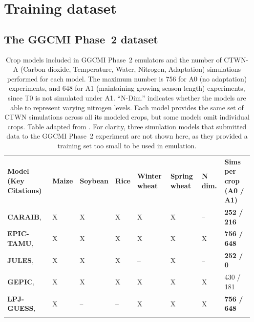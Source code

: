 \documentclass[gmdd]{copernicus} %
\begin{document}
\section{Training dataset}
\label{S:2}
\subsection{The GGCMI Phase~2 dataset}
\label{S:2a}
\begin{table}[ht]
    \caption{
    Crop models included in GGCMI Phase~2 emulators and the number of CTWN-A (Carbon dioxide, Temperature, Water, Nitrogen, Adaptation) simulations performed for each model. 
    The maximum number is 756 for A0 (no adaptation) experiments, and 648 for A1 (maintaining growing season length) experiments, since T0 is not simulated under A1. 
    ``N-Dim.'' indicates whether the models are able to represent varying nitrogen levels.
    Each model provides the same set of CTWN simulations across all its modeled crops, but some models omit individual crops.
    Table adapted from \citet{franke2020ctwnexperiment}. 
    For clarity, three simulation models that submitted data to the GGCMI Phase~2 experiment \citep{franke2020ctwnexperiment} are not shown here, as they provided a training set too small to be used in emulation.
    }
    \label{table:models}
    \begin{tabular}{p{6cm} p{1cm} p{1cm} p{1cm} p{1cm} p{1cm} p{1cm} p{1.9cm}}
        \tophline
        \textbf{Model (Key Citations)} & \textbf{Maize} & \textbf{Soybean} & \textbf{Rice} & \textbf{Winter wheat} & \textbf{Spring wheat} & \textbf{N dim.} & \textbf{Sims per crop (A0 / A1)}\\ \middlehline
        \textbf{CARAIB},    \citet{Dury2011, Pirttioja2015}    & X & X & X & X & X & -- & \textbf{252 / 216} \\ \middlehline
        \textbf{EPIC-TAMU}, \citet{Izaurralde06}               & X & X & X & X & X & X & \textbf{756 / 648} \\ \middlehline
        \textbf{JULES},     \citet{Osborne2015, Williams2015, Williams2017} & X & X & X & -- & X & -- & \textbf{252 / 0}\\ \middlehline
        \textbf{GEPIC},     \citet{LIU2007478, FOLBERTH201221} & X & X & X & X & X & X & 430 / 181\\ \middlehline
        \textbf{LPJ-GUESS}, \citet{Lindeskog2013, Olin2015}    & X & -- & -- & X & X & X & \textbf{756 / 648}\\  \middlehline

\end{tabular}
\end{table}
\end{document}
